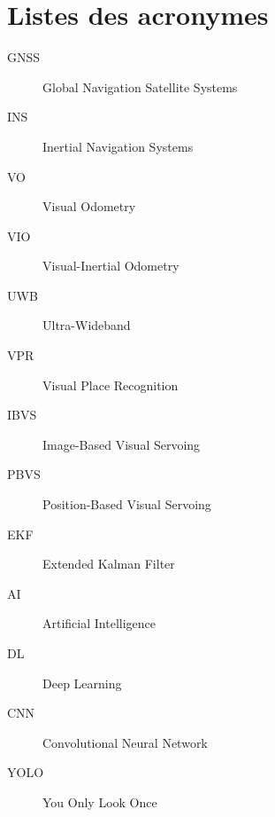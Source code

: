 \documentclass[12pt, a4paper, twoside, openright]{report}
\begin{document}
\section{Listes des acronymes}
\begin{description}
    \item[GNSS] Global Navigation Satellite Systems
    \item[INS] Inertial Navigation Systems
    \item[VO] Visual Odometry
    \item[VIO] Visual-Inertial Odometry
    \item[UWB] Ultra-Wideband
    \item[VPR] Visual Place Recognition
    \item[IBVS] Image-Based Visual Servoing
    \item[PBVS] Position-Based Visual Servoing
    \item[EKF] Extended Kalman Filter
    \item[AI] Artificial Intelligence
    \item[DL] Deep Learning
    \item[CNN] Convolutional Neural Network
    \item[YOLO] You Only Look Once
\end{description}
\end{document}
